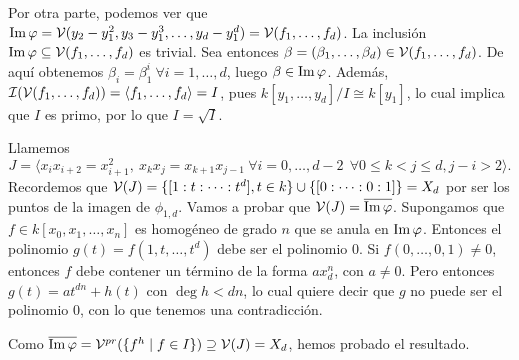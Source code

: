 \documentclass[twoside]{article}
\begin{document}
\begin{solucion}
\begin{enumerate}
Por otra parte, podemos ver que $\operatorname{Im}\varphi=\mathcal{V}(y_2-y_1^2, y_3-y_1^3,\dots, y_d-y_1^d)=\mathcal{V}(f_1,\dots,f_d)$. La inclusión $\operatorname{Im}\varphi\subseteq \mathcal{V}(f_1,\dots,f_d)$ es trivial. Sea entonces $\beta=(\beta_1,\dots,\beta_d)\in\mathcal{V}(f_1,\dots,f_d)$. De aquí obtenemos $\beta_i=\beta_1^i\ \forall i=1,\dots, d$, luego $\beta\in\operatorname{Im}\varphi$.
Además, $\mathcal{I}(\mathcal{V}(f_1,\dots,f_d))=\langle f_1,\dots,f_d\rangle=I$, pues $k[y_1,\dots,y_d]/I\cong k[y_1]$, lo cual implica que $I$ es primo, por lo que $I=\sqrt{I}$. 

Llamemos $$J=\langle x_ix_{i+2}=x_{i+1}^2,\ x_kx_j=x_{k+1}x_{j-1}\ \forall i=0,\dots,d-2\ \ \forall 0\leq k< j\leq d, j-i>2 \rangle.$$ %
Recordemos que $\mathcal{V}(J)=\{[1:t:\dots:t^d], t\in k\}\cup\{[0:\dots:0:1]\}=X_d$ por ser los puntos de la imagen de $\phi_{1,d}$. Vamos a probar que $\mathcal{V}(J)=\overline{\operatorname{Im}\varphi}$. Supongamos que $f\in k[x_0,x_1,\dots, x_n]$ es homogéneo de grado $n$ que se anula en $\operatorname{Im}\varphi$. Entonces el polinomio $g(t)=f(1,t,\dots,t^d)$ debe ser el polinomio 0. Si $f(0,\dots,0,1)\neq 0$, entonces $f$ debe contener un término de la forma $ax_d^n$, con $a\neq 0$. Pero entonces $g(t)=at^{dn}+h(t)$ con $\deg h<dn$, lo cual quiere decir que $g$ no puede ser el polinomio 0, con lo que tenemos una contradicción. 

Como $\overline{\operatorname{Im}\varphi}=\mathcal{V}^{pr}(\{f^h\mid f\in I\})\supseteq\mathcal{V}(J)=X_d$, hemos probado el resultado.


\end{enumerate}
\end{solucion}
\end{document}
